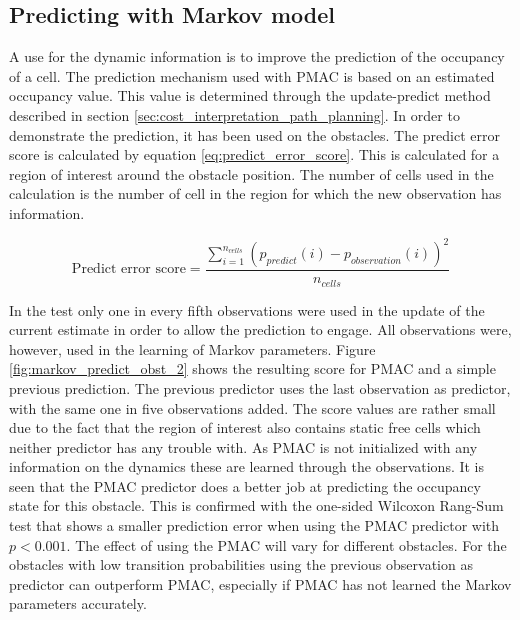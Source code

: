 
\subsection{Predicting with Markov model}

A use for the dynamic information is to improve the prediction of the occupancy of a cell. The prediction mechanism used with PMAC is based on an estimated occupancy value. This value is determined through the update-predict method described in section \vref{sec:cost_interpretation_path_planning}. 
In order to demonstrate the prediction, it has been used on the obstacles. The predict error score is calculated by equation \ref{eq:predict_error_score}. This is calculated for a region of interest around the obstacle position. The number of cells used in the calculation is the number of cell in the region for which the new observation has information. 

\begin{equation}
	\text{Predict error score} = \frac{\sum\limits_{i=1}^{n_{cells}} (p_{predict}(i)-p_{observation}(i))^2}{n_{cells}}
	\label{eq:predict_error_score}
\end{equation} 

In the test only one in every fifth observations were used in the update of the current estimate in order to allow the prediction to engage. All observations were, however, used in the learning of Markov parameters. Figure \ref{fig:markov_predict_obst_2} shows the resulting score for PMAC and a simple previous prediction. The previous predictor uses the last observation as predictor, with the same one in five observations added. The score values are rather small due to the fact that the region of interest also contains static free cells which neither predictor has any trouble with. As PMAC is not initialized with any information on the dynamics these are learned through the observations. 
It is seen that the PMAC predictor does a better job at predicting the occupancy state for this obstacle. 
This is confirmed with the one-sided Wilcoxon Rang-Sum test that shows a smaller prediction error when using the PMAC predictor with $p<0.001$.
The effect of using the PMAC will vary for different obstacles. For the obstacles with low transition probabilities using the previous observation as predictor can outperform PMAC, especially if PMAC has not learned the Markov parameters accurately. 

